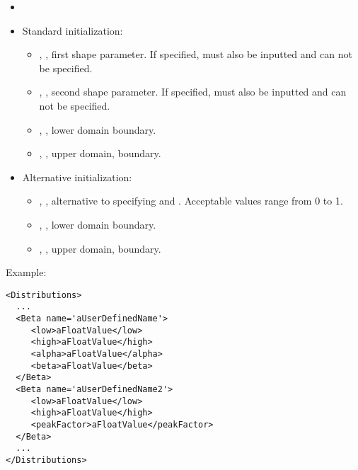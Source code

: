 %
\attrIntro
\vspace{-5mm}
\begin{itemize}
  \itemsep0em
  \item \nameDescription
\end{itemize}
\vspace{-5mm}
\subnodesIntro
\begin{itemize}
  \item Standard initialization:
    \begin{itemize}
    \item {}, , first shape
     parameter.  If specified,  must also be inputted and
      can not be specified.
%
     \item {}, , second shape
      parameter.  If specified,  must also be inputted and
       can not be specified.
%
       \item {}, , lower domain
       boundary. 
       \item {}, , upper domain,
         boundary. 
      \end{itemize}
     \item Alternative initialization:
     \begin{itemize}
        \item {}, , alternative
         to specifying  and .  Acceptable values range from
        0 to 1.
%
       \item {}, , lower domain
       boundary. 
       \item {}, , upper domain,
         boundary. 
      \end{itemize}
\end{itemize}

Example:
\begin{lstlisting}[style=XML]
<Distributions>
  ...
  <Beta name='aUserDefinedName'>
     <low>aFloatValue</low>
     <high>aFloatValue</high>
     <alpha>aFloatValue</alpha>
     <beta>aFloatValue</beta>
  </Beta>
  <Beta name='aUserDefinedName2'>
     <low>aFloatValue</low>
     <high>aFloatValue</high>
     <peakFactor>aFloatValue</peakFactor>
  </Beta>
  ...
</Distributions>
\end{lstlisting}

